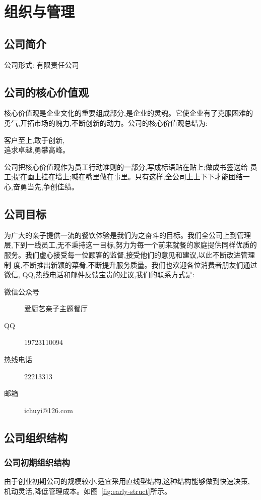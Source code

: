 \chapter{组织与管理}
\section{公司简介}
公司形式: 有限责任公司

\section{公司的核心价值观}
核心价值观是企业文化的重要组成部分,是企业的灵魂。它使企业有了克服困难的
勇气,开拓市场的魄力,不断创新的动力。公司的核心价值观总结为:
\begin{center}
        客户至上,敢于创新,\\追求卓越,勇攀高峰。
\end{center}
公司把核心价值观作为员工行动准则的一部分,写成标语贴在贴上;做成书签送给
员工;提在画上挂在墙上;喊在嘴里做在事里。只有这样,全公司上上下下才能团结一
心,奋勇当先,争创佳绩。

\section{公司目标}
为广大的亲子提供一流的餐饮体验是我们为之奋斗的目标。我们全公司上到管理
层,下到一线员工,无不秉持这一目标,努力为每一个前来就餐的家庭提供同样优质的
服务。我们虚心接受每一位顾客的监督,接受他们的意见和建议,以此不断改进管理制
度,不断推出新颖的菜肴,不断提升服务质量。我们也欢迎各位消费者朋友们通过微信,
QQ,热线电话和邮件反馈宝贵的建议,我们的联系方式是:
\begin{description}
        \item[微信公众号] 爱厨艺亲子主题餐厅
        \item[QQ] 19723110094
        \item[热线电话] 22213313
        \item[邮箱] ichuyi@126.com
\end{description}

\section{公司组织结构}
\subsection{公司初期组织结构}
由于创业初期公司的规模较小,适宜采用直线型结构,这种结构能够做到快速决策,
机动灵活,降低管理成本。如图~\ref{fig:early-struct}所示。

